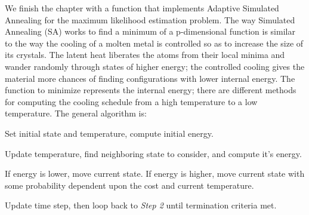 \documentclass{book}
\begin{document}
We finish the chapter with a function that implements Adaptive
Simulated Annealing for the maximum likelihood estimation
problem. The way Simulated Annealing (SA) works to find a
minimum of a p-dimensional function is similar to the way the
cooling of a molten metal is controlled so as to increase the
size of its crystals. The latent heat liberates the atoms from
their local minima and wander randomly through states of higher
energy; the controlled cooling gives the material more chances
of finding configurations with lower internal energy. The
function to minimize represents the internal energy; there are
different methods for computing the cooling schedule from a
high temperature to a low temperature. The general algorithm
is:

\begin{compactenum}

\item Set initial state and temperature, compute initial
energy.

\item Update temperature, find neighboring state to consider,
and compute it's energy.

\item If energy is lower, move current state. If energy is
higher, move current state with some probability dependent upon
the cost and current temperature.

\item Update time step, then loop back to \emph{Step 2} until
termination criteria met.

\end{compactenum}
\end{document}
